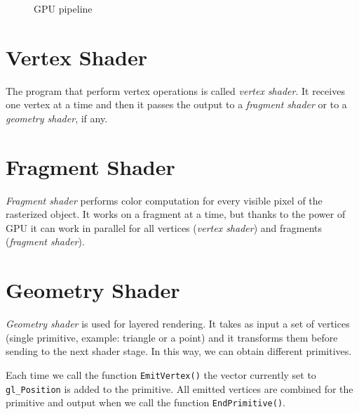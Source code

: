 \begin{figure}
{}
    \caption{GPU pipeline} \label{fig:gpu-pipeline}
\end{figure}


\section{Vertex Shader}
The program that perform vertex operations is called \textit{vertex shader}. It receives one vertex at a time and then it passes the output to a \textit{fragment shader} or to a \textit{geometry shader}, if any.

\section{Fragment Shader}
\textit{Fragment shader} performs color computation for every visible pixel of the rasterized object. It works on a fragment at a time, but thanks to the power of GPU it can work in parallel for all vertices (\textit{vertex shader}) and fragments (\textit{fragment shader}).

\section{Geometry Shader}
\textit{Geometry shader} is used for layered rendering. It takes as input a set of vertices (single primitive, example: triangle or a point) and it transforms them before sending to the next shader stage. In this way, we can obtain different primitives.

Each time we call the function \texttt{EmitVertex()} the vector currently set to \texttt{gl\_Position} is added to the primitive. All emitted vertices are combined for the primitive and output when we call the function \texttt{EndPrimitive()}.
